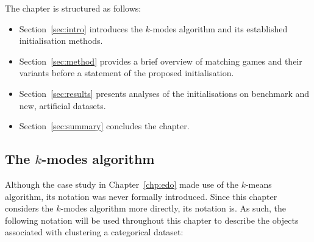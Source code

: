 The chapter is structured as follows:
\begin{itemize}
    \item Section~\ref{sec:intro} introduces the \(k\)-modes algorithm and its
        established initialisation methods.
    \item Section~\ref{sec:method} provides a brief overview of
        matching games and their variants before a statement of the proposed
        initialisation.
    \item Section~\ref{sec:results} presents analyses of the initialisations
        on benchmark and new, artificial datasets.
    \item Section~\ref{sec:summary} concludes the chapter.
\end{itemize}


\subsection{The \(k\)-modes algorithm}\label{subsec:kmodes}

Although the case study in Chapter~\ref{chp:edo} made use of the \(k\)-means
algorithm, its notation was never formally introduced. Since this chapter
considers the \(k\)-modes algorithm more directly, its notation is. As such, the
following notation will be used throughout this chapter to describe the objects
associated with clustering a categorical dataset:

